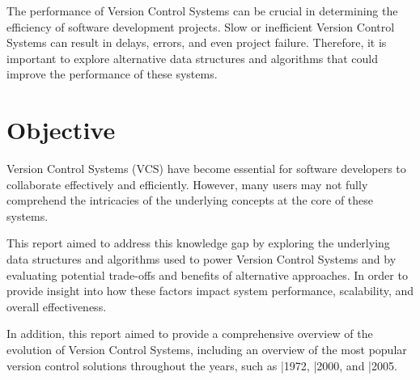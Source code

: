 The performance of Version Control Systems can be crucial in determining the efficiency of software development projects. Slow or inefficient Version Control Systems can result in delays, errors, and even project failure. Therefore, it is important to explore alternative data structures and algorithms that could improve the performance of these systems.

\section{Objective}
\noindent
Version Control Systems (VCS) have become essential for software developers to collaborate effectively and efficiently. However, many users may not fully comprehend the intricacies of the underlying concepts at the core of these systems.
\vspace{9pt}

This report aimed to address this knowledge gap by exploring the underlying data structures and algorithms used to power Version Control Systems and by evaluating potential trade-offs and benefits of alternative approaches. In order to provide insight into how these factors impact system performance, scalability, and overall effectiveness.
\vspace{9pt}

In addition, this report aimed to provide a comprehensive overview of the evolution of Version Control Systems, including an overview of the most popular version control solutions throughout the years, such as |1972, |2000, and |2005.